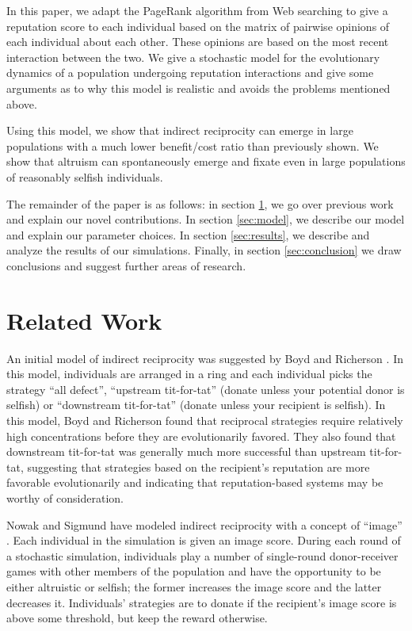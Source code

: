 \documentclass{amsart}
\begin{document}
In this paper, we adapt the PageRank algorithm from Web searching to
give a reputation score to each individual based on the matrix of
pairwise opinions of each individual about each other. These opinions
are based on the most recent interaction between the two. We give a
stochastic model for the evolutionary dynamics of a population
undergoing reputation interactions and give some arguments as to why
this model is realistic and avoids the problems mentioned above.

Using this model, we show that indirect reciprocity can emerge in
large populations with a much lower benefit/cost ratio than previously
shown. We show that altruism can spontaneously emerge and fixate even
in large populations of reasonably selfish individuals.

The remainder of the paper is as follows: in section
\ref{sec:related}, we go over previous work and explain our novel
contributions. In section \ref{sec:model}, we describe our model and
explain our parameter choices. In section \ref{sec:results}, we
describe and analyze the results of our simulations. Finally, in
section \ref{sec:conclusion} we draw conclusions and suggest further
areas of research.

\section{Related Work}\label{sec:related}

An initial model of indirect reciprocity was suggested by Boyd and
Richerson \cite{boyd_evolution_1989}. In this model, individuals are
arranged in a ring and each individual picks the strategy ``all
defect'', ``upstream tit-for-tat'' (donate unless your potential donor
is selfish) or ``downstream tit-for-tat'' (donate unless your
recipient is selfish). In this model, Boyd and Richerson found that
reciprocal strategies require relatively high concentrations before
they are evolutionarily favored. They also found that downstream
tit-for-tat was generally much more successful than upstream
tit-for-tat, suggesting that strategies based on the recipient's
reputation are more favorable evolutionarily and indicating that
reputation-based systems may be worthy of consideration.

Nowak and Sigmund have modeled indirect reciprocity with a concept of
``image'' \cite{nowak_evolution_1998}. Each individual in the
simulation is given an image score. During each round of a stochastic
simulation, individuals play a number of single-round donor-receiver
games with other members of the population and have the opportunity to
be either altruistic or selfish; the former increases the image score
and the latter decreases it. Individuals’ strategies are to donate if
the recipient’s image score is above some threshold, but keep the
reward otherwise.
\end{document}
